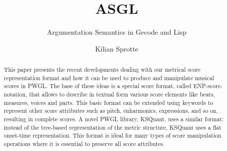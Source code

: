 \documentclass[runningheads,a4paper]{llncs}
\begin{document}
\mainmatter  %

\title{ASGL}
\subtitle{Argumentation Semantics in Gecode and Lisp}


%
%
\author{Kilian Sprotte}

%


%
%

\maketitle

\newcommand{\grsem}{grounded semantics}
\newcommand{\prsem}{preferred semantics}
\newcommand{\stsem}{stable semantics}
\newcommand{\cosem}{complete semantics}

\begin{abstract}
  This paper presents the recent developments dealing with our
  metrical score representation format and how it can be used to
  produce and manipulate musical scores in PWGL. The base of these
  ideas is a special score format, called ENP-score-notation, that
  allows to describe in textual form various score elements like
  beats, measures, voices and parts. This basic format can be extended
  using keywords to represent other score attributes such as pitch,
  enharmonics, expressions, and so on, resulting in complete scores. A
  novel PWGL library, KSQuant, uses a similar format: instead of the
  tree-based representation of the metric structure, KSQuant uses a
  flat onset-time representation.  This format is ideal for many types
  of score manipulation operations where it is essential to preserve
  all score attributes.
\end{abstract}
\end{document}
